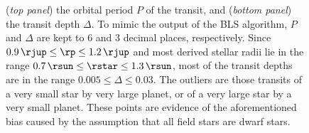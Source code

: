 \begin{figure}
\begin{center}
{({\it top panel}) the orbital period $P$ of the transit, and %
({\it bottom panel}) the transit depth $\Delta$.
To mimic the output of the BLS algorithm, $P$ and $\Delta$ are kept to 6 and 3 decimal places, respectively.
Since \mbox{$0.9\,\rjup \leq \rp \leq 1.2\,\rjup$} and most derived stellar radii lie in the range \mbox{$0.7\,\rsun \leq \rstar \leq 1.3\,\rsun$}, most of the transit depths are in the range \mbox{$0.005 \leq \Delta \leq 0.03$}.
The outliers are those transits of a very small star by very large planet, or of a very large star by a very small planet. 
These points are evidence of the aforementioned bias caused by the assumption that all field stars are dwarf stars. %
}
\label{cha:human:sec:model:fig:bls1}
\end{center}
\end{figure}


